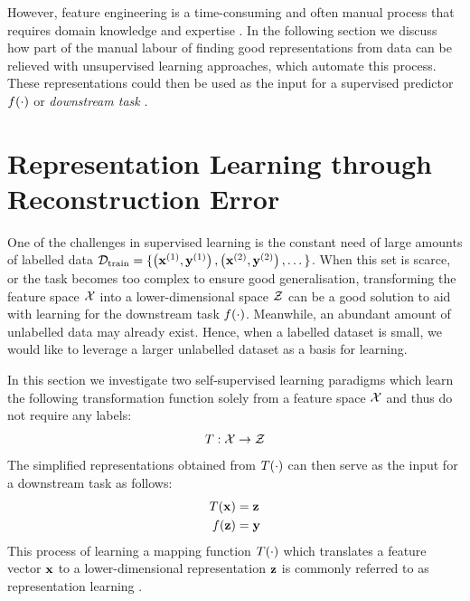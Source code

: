 	However, feature engineering is a time-consuming and often manual process that requires domain knowledge and expertise \citep{przybyszewskiUseDomainKnowledge2017, weiIntegrationDomainKnowledgeGuided2021}. In the following section we discuss how part of the manual labour of finding good representations from data can be relieved with unsupervised learning approaches, which automate this process. These representations could then be used as the input for a supervised predictor $f(\cdot)$ or \textit{downstream task} \citep{zhangOmiEmbedUnifiedMultiTask2021}.


\section{Representation Learning through Reconstruction Error} \label{cha:bg_reconstr}



One of the challenges in supervised learning is the constant need of large amounts of labelled data $\mathcal{D}_{\text{train}} = \{ \left( \mathbf{x}^{(1)}, \mathbf{y}^{(1)} \right), \left( \mathbf{x}^{(2)}, \mathbf{y}^{(2)} \right), \dots \}$. When this set is scarce, or the task becomes too complex to ensure good generalisation, transforming the feature space $\mathcal{X}$ into a lower-dimensional space $\mathcal{Z}$ can be a good solution to aid with learning for the downstream task $f(\cdot)$. Meanwhile, an abundant amount of unlabelled data may already exist. Hence, when a labelled dataset is small, we would like to leverage a larger unlabelled dataset as a basis for learning.

In this section we investigate two self-supervised learning paradigms which learn the following transformation function solely from a feature space $\mathcal{X}$ and thus do not require any labels:
$$T: \mathcal{X} \rightarrow \mathcal{Z}$$
The simplified representations obtained from $T(\cdot)$ can then serve as the input for a downstream task as follows:
\begin{align*}
	T(\mathbf{x}) &=  \mathbf{z} \\
	f(\mathbf{z}) &= \mathbf{y} 
\end{align*}
This process of learning a mapping function $T(\cdot)$ which translates a feature vector $\mathbf{x}$ to a lower-dimensional representation $\mathbf{z}$ is commonly referred to as representation learning \citep{le-khacContrastiveRepresentationLearning2020}. 

